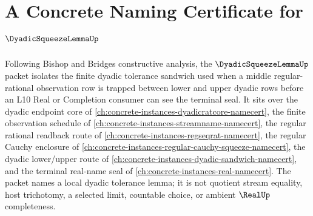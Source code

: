 \chapter{A Concrete Naming Certificate for $\DyadicSqueezeLemmaUp$}
\label{ch:concrete-instances-dyadic-squeeze-lemma-namecert}

Following Bishop and Bridges constructive analysis, the $\DyadicSqueezeLemmaUp$ packet isolates the finite dyadic tolerance sandwich used when a middle regular-rational observation row is trapped between lower and upper dyadic rows before an L10 Real or Completion consumer can see the terminal seal. It sits over the dyadic endpoint core of \autoref{ch:concrete-instances-dyadicratcore-namecert}, the finite observation schedule of \autoref{ch:concrete-instances-streamname-namecert}, the regular rational readback route of \autoref{ch:concrete-instances-regseqrat-namecert}, the regular Cauchy enclosure of \autoref{ch:concrete-instances-regular-cauchy-squeeze-namecert}, the dyadic lower/upper route of \autoref{ch:concrete-instances-dyadic-sandwich-namecert}, and the terminal real-name seal of \autoref{ch:concrete-instances-real-namecert}. The packet names a local dyadic tolerance lemma; it is not quotient stream equality, host trichotomy, a selected limit, countable choice, or ambient $\RealUp$ completeness.

